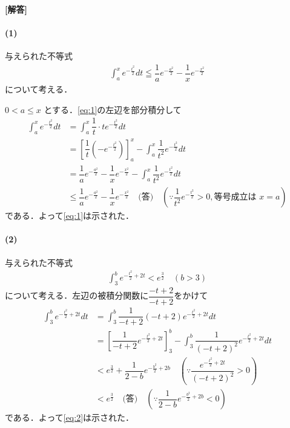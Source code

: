 \documentclass[../../main.tex]{subfiles}
\begin{document}
\begin{oframed}
  
\end{oframed}

{\bf [解答]}

\paragraph{(1)}

与えられた不等式
\begin{align}
  \int_a^xe^{-\frac{t^2}{2}}dt\leqq\dfrac{1}{a}e^{-\frac{a^2}{2}}-\dfrac{1}{x}e^{-\frac{x^2}{2}} \label{eq:1}
\end{align}
について考える．

$0 < a \le x$ とする．\cref{eq:1}の左辺を部分積分して
\begin{align}
  \int_a^x e^{-\frac{t^2}{2}} dt
  &= \int_a^x \dfrac{1}{t} \cdot t e^{-\frac{t^2}{2}} dt \\
  &= \left[ \dfrac{1}{t} (-e^{-\frac{t^2}{2}}) \right]_a^x - \int_a^x \dfrac{1}{t^2} e^{-\frac{t^2}{2}} dt \\
  &= \dfrac{1}{a} e^{-\frac{a^2}{2}} - \dfrac{1}{x} e^{-\frac{x^2}{2}} - \int_a^x \dfrac{1}{t^2} e^{-\frac{t^2}{2}} dt \\
  &\le \dfrac{1}{a} e^{-\frac{a^2}{2}} - \dfrac{1}{x} e^{-\frac{x^2}{2}} \quad \text{(答)} \quad \left(\because \dfrac{1}{t^2} e^{-\frac{t^2}{2}} > 0, \text{等号成立は } x=a\right)
\end{align}
である．よって\cref{eq:1}は示された．

\paragraph{(2)}

与えられた不等式
\begin{align}
  \int_3^be^{-\frac{t^2}{2}+2t}<e^{\frac{3}{2}} \quad (b>3) \label{eq:2}
\end{align}
について考える．左辺の被積分関数に$\dfrac{-t+2}{-t+2}$をかけて
\begin{align}
  \int_3^b e^{-\frac{t^2}{2} + 2t} dt
  &= \int_3^b \dfrac{1}{-t+2} (-t+2) e^{-\frac{t^2}{2} + 2t} dt \\
  &= \left[ \dfrac{1}{-t+2} e^{-\frac{t^2}{2} + 2t} \right]_3^b - \int_3^b \dfrac{1}{(-t+2)^2} e^{-\frac{t^2}{2} + 2t} dt \\
  &< e^{\frac{3}{2}} + \dfrac{1}{2-b} e^{-\frac{b^2}{2} + 2b} \quad \left(\because \dfrac{e^{-\frac{t^2}{2} + 2t}}{(-t+2)^2} > 0\right) \\
  &< e^{\frac{3}{2}} \quad \text{(答)} \quad \left(\because \dfrac{1}{2-b} e^{-\frac{b^2}{2} + 2b} < 0\right)
\end{align}
である．よって\cref{eq:2}は示された．
\end{document}
